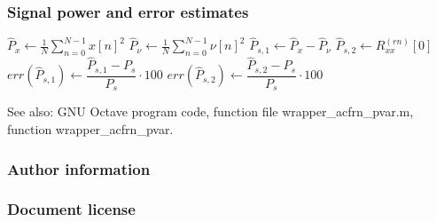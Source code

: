 \documentclass[11pt,aspectratio=169]{beamer}
\def\PresCopyrightType{ccby} %
\begin{document}
	\begin{frame}
		\frametitle{\appendixname{} \textemdash{} Signal power and error estimates}
		\begin{algorithmic}
			\State $\hat{P}_x \gets \frac{1}{N} \sum\limits_{n=0}^{N-1} x[n]^2$ 
			\State $\hat{P}_{\nu} \gets \frac{1}{N} \sum\limits_{n=0}^{N-1} \nu[n]^2$ 
			\State $\hat{P}_{s,1} \gets \hat{P}_x - \hat{P}_{\nu}$ 
			\State $\hat{P}_{s,2} \gets R_{xx}^{(rn)}[0]$ 
			\State $err(\hat{P}_{s,1}) \gets \dfrac{\hat{P}_{s,1} - P_s}{P_s} \cdot 100$ 
			\State $err(\hat{P}_{s,2}) \gets \dfrac{\hat{P}_{s,2} - P_s}{P_s} \cdot 100$ 
		\end{algorithmic}
		\vspace*{.5em}
		\small See also: GNU Octave program code\cite{progcode}, function file wrapper\_acfrn\_pvar.m, function wrapper\_acfrn\_pvar.
	\end{frame}
	\begin{frame}[noframenumbering]
		\frametitle{\appendixname{} \textemdash{} Author information}
		\RIPauthorinfo{}
	\end{frame}
	\begin{frame}[noframenumbering]
		\frametitle{\appendixname{} \textemdash{} Document license}
		\expandafter\RIPcopyrightinfo\expandafter{\PresCopyrightType}
	\end{frame}
\end{document}

